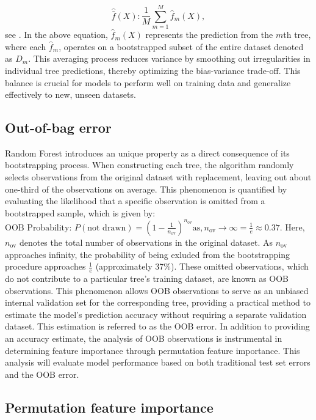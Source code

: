 \documentclass[12pt]{article}
\begin{document}
  \begin{equation}
\hat{\bar{f}}(X): \frac{1}{M} \sum_{m=1}^{M}\hat{f}_m(X),
 \end{equation}
see \citep[Section~8.2.1]{statlearning}.
In the above equation, $\hat{f}_m(X)$ represents the prediction from the $m$th tree, where each $\hat{f}_m$, operates on a bootstrapped subset of the entire dataset denoted as $D_m$.
This averaging process reduces variance by smoothing out irregularities in individual tree predictions, thereby optimizing the bias-variance trade-off. This balance is crucial for models to perform well on training data and generalize effectively to new, unseen datasets.

	
\subsection{Out-of-bag error}
Random Forest introduces an unique property as a direct consequence of its bootstrapping process. 
When constructing each tree, the algorithm randomly selects observations from the original dataset with replacement, leaving out about one-third of the observations on average.
This phenomenon is quantified by evaluating the likelihood that a specific observation is omitted from a bootstrapped sample, which is given by:
$\text{OOB Probability: } P(\text{not drawn}) = \left(1-\frac{1}{n_\text{ov}}\right)^{n_\text{ov}} \text{as}, n_\text{ov} \to \infty = \frac{1}{e} \approx 0.37.$
Here, $n_\text{ov}$ denotes the total number of observations in the original dataset.
As $n_\text{ov}$ approaches infinity, the probability of being exluded from the bootstrapping procedure approaches $\frac{1}{e}$ (approximately 37\%).
These omitted observations, which do not contribute to a particular tree’s training dataset, are known as OOB observations.
This phenomenon allows OOB observations to serve as an unbiased internal validation set for the corresponding tree, providing a practical method to estimate the model's prediction accuracy without requiring a separate validation dataset.
 This estimation is referred to as the OOB error.
In addition to providing an accuracy estimate, the analysis of OOB observations is instrumental in determining feature importance through permutation feature importance. This analysis will evaluate model performance based on both traditional test set errors and the OOB error.


\subsection{Permutation feature importance}
\end{document}
